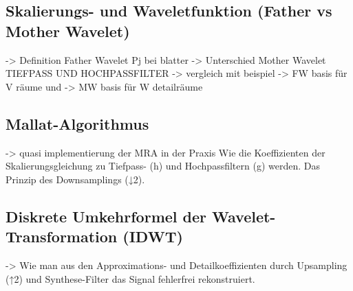 \documentclass[a4paper,11pt,bibliography=totoc,listof=totoc,headinclude=true,cleardoublepage=empty,oneside]{scrbook}
\theoremstyle{definition}
\theoremstyle{remark}
\begin{document}
 
 \subsection{Skalierungs- und Waveletfunktion (Father vs Mother Wavelet)}

 -> Definition Father Wavelet Pj bei blatter \cite[S. 109]{blatterWaveletsEinfuhrung2003} \cite[S. 110 / Section 5.2]{blatterWaveletsEinfuhrung2003}
  \cite[S. 111 / Satz 5.3]{blatterWaveletsEinfuhrung2003}
 -> Unterschied Mother Wavelet TIEFPASS UND HOCHPASSFILTER \cite[S. 124]{blatterWaveletsEinfuhrung2003}
 -> vergleich mit beispiel \cite[S. 127]{blatterWaveletsEinfuhrung2003}
 -> FW basis für V räume und 
 -> MW basis für W detailräume \cite[S.122 / Satz 5.12, 5.13]{blatterWaveletsEinfuhrung2003}


 
 \subsection{Mallat-Algorithmus}

 -> quasi implementierung der MRA in der Praxis
 Wie die Koeffizienten der Skalierungsgleichung zu Tiefpass- (h) und 
 Hochpassfiltern (g) werden. Das Prinzip des Downsamplings (↓2).

 \subsection{Diskrete Umkehrformel der Wavelet-Transformation (IDWT)}

 -> Wie man aus den Approximations- und Detailkoeffizienten durch Upsampling 
 (↑2) und Synthese-Filter das Signal fehlerfrei rekonstruiert.
\end{document}
